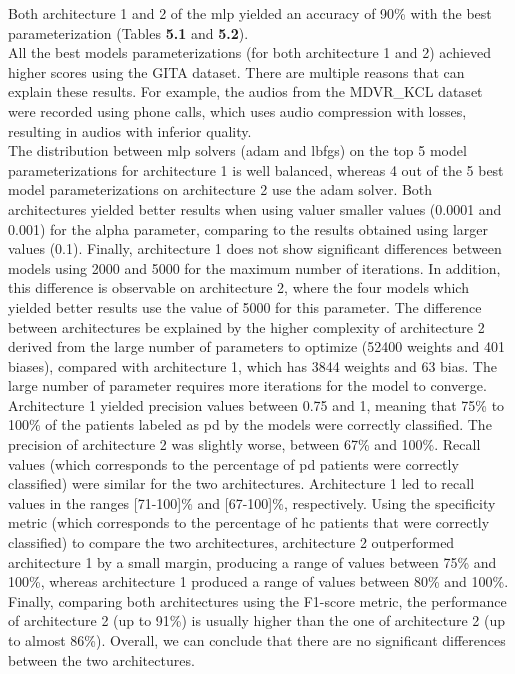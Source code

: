 Both architecture 1 and 2 of the \gls{mlp} yielded an accuracy of 90\% with the best parameterization (Tables \textbf{5.1} and \textbf{5.2}). \\
All the best models parameterizations (for both architecture 1 and 2) achieved higher scores using the GITA dataset. There are multiple reasons that can explain these results. For example, the audios from the MDVR\_KCL dataset were recorded using phone calls, which uses audio compression with losses, resulting in audios with inferior quality. \\
The distribution between \gls{mlp} solvers (adam and lbfgs) on the top 5 model parameterizations for architecture 1 is well balanced, whereas 4 out of the 5 best model parameterizations on architecture 2 use the adam solver. Both architectures yielded better results when using valuer smaller values (0.0001 and 0.001) for the alpha parameter, comparing to the results obtained using larger values (0.1). Finally, architecture 1 does not show significant differences between models using 2000 and 5000 for the maximum number of iterations. In addition, this difference is observable on architecture 2, where the four models which yielded better results use the value of 5000 for this parameter. The difference between architectures be explained by the higher complexity of architecture 2 derived from the large number of parameters to optimize (52400 weights and 401 biases), compared with architecture 1, which has 3844 weights and 63 bias. The large number of parameter requires more iterations for the model to converge.
Architecture 1 yielded precision values between 0.75 and 1, meaning that 75\% to 100\% of the patients labeled as \gls{pd} by the models were correctly classified. The precision of architecture 2 was slightly worse, between 67\% and 100\%. Recall values (which corresponds to the percentage of \gls{pd} patients were correctly classified) were similar for the two architectures. Architecture 1 led to recall values in the ranges [71-100]\% and [67-100]\%, respectively. Using the specificity metric (which corresponds to the percentage of \gls{hc} patients that were correctly classified) to compare the two architectures, architecture 2 outperformed architecture 1 by a small margin, producing a range of values between 75\% and 100\%, whereas architecture 1 produced a range of values between 80\% and 100\%. Finally, comparing both architectures using the F1-score metric, the performance of architecture 2 (up to 91\%) is usually higher than the one of architecture 2 (up to almost 86\%).
Overall, we can conclude that there are no significant differences between the two architectures.

